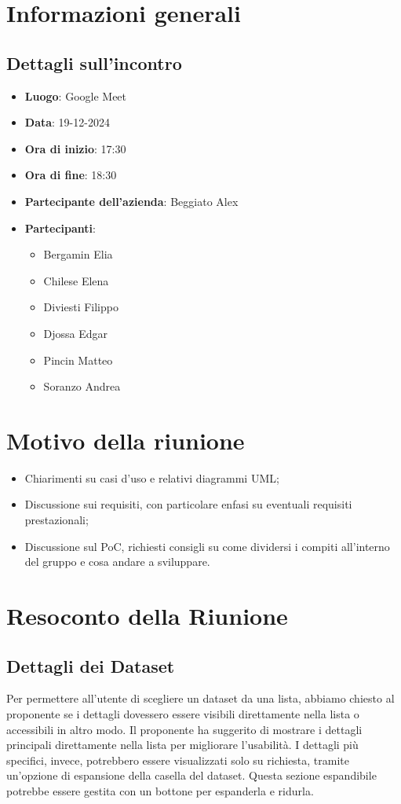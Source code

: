 \section{Informazioni generali}
\subsection{Dettagli sull'incontro}
\begin{itemize}
    \item \textbf{Luogo}: Google Meet
    \item \textbf{Data}: 19-12-2024
    \item \textbf{Ora di inizio}: 17:30
    \item \textbf{Ora di fine}: 18:30
    \item \textbf{Partecipante dell'azienda}: Beggiato Alex
    \item \textbf{Partecipanti}:
    \begin{itemize}
        \item Bergamin Elia
        \item Chilese Elena
        \item Diviesti Filippo
        \item Djossa Edgar
        \item Pincin Matteo 
        \item Soranzo Andrea  
    \end{itemize}
\end{itemize}

\section{Motivo della riunione}
\begin{itemize}
    \item Chiarimenti su casi d'uso e relativi diagrammi UML;
    \item Discussione sui requisiti, con particolare enfasi su eventuali requisiti prestazionali;
    \item Discussione sul PoC, richiesti consigli su come dividersi i compiti all'interno del gruppo e cosa andare a sviluppare.
\end{itemize}

\section{Resoconto della Riunione}
\subsection{Dettagli dei Dataset}
Per permettere all'utente di scegliere un dataset da una lista, abbiamo chiesto al proponente se i dettagli dovessero essere visibili direttamente nella lista o accessibili in altro modo.
Il proponente ha suggerito di mostrare i dettagli principali direttamente nella lista per migliorare l'usabilità. 
I dettagli più specifici, invece, potrebbero essere visualizzati solo su richiesta, tramite un'opzione di espansione della casella del dataset. 
Questa sezione espandibile potrebbe essere gestita con un bottone per espanderla e ridurla.

